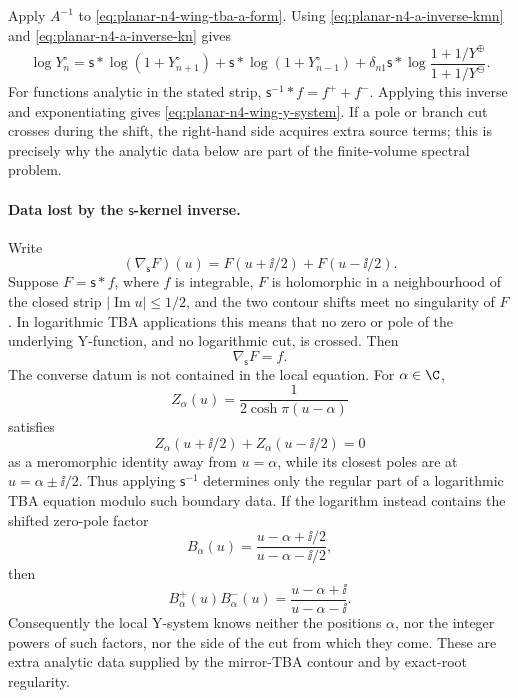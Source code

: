 Apply \(A^{-1}\) to \eqref{eq:planar-n4-wing-tba-a-form}.  Using
\eqref{eq:planar-n4-a-inverse-kmn} and \eqref{eq:planar-n4-a-inverse-kn}
gives
\[
  \log Y_n^\circ
  =
  \mathsf s*\log(1+Y_{n+1}^\circ)
  +
  \mathsf s*\log(1+Y_{n-1}^\circ)
  +
  \delta_{n1}\mathsf s*
  \log\frac{1+1/Y^\oplus}{1+1/Y^\ominus}.
\]
For functions analytic in the stated strip,
\(\mathsf s^{-1}*f=f^+ + f^-\).  Applying this inverse and exponentiating gives
\eqref{eq:planar-n4-wing-y-system}.  If a pole or branch cut crosses during
the shift, the right-hand side acquires extra source terms; this is precisely
why the analytic data below are part of the finite-volume spectral problem.

\paragraph{Data lost by the \(\mathsf s\)-kernel inverse.}
Write
\[
  (\nabla_{\mathsf s}F)(u)=F(u+\ii/2)+F(u-\ii/2).
\]
Suppose \(F=\mathsf s*f\), where \(f\) is integrable, \(F\) is holomorphic in
a neighbourhood of the closed strip \(|\operatorname{Im}u|\leq1/2\), and the
two contour shifts meet no singularity of \(F\).  In logarithmic TBA
applications this means that no zero or pole of the underlying Y-function, and
no logarithmic cut, is crossed.  Then
\begin{equation}
  \nabla_{\mathsf s}F=f .
  \label{eq:planar-n4-s-inverse-regular-domain}
\end{equation}
The converse datum is not contained in the local equation.  For
\(\alpha\in\C\),
\begin{equation}
  Z_\alpha(u)=\frac{1}{2\cosh\pi(u-\alpha)}
  \label{eq:planar-n4-s-inverse-zero-mode}
\end{equation}
satisfies
\[
  Z_\alpha(u+\ii/2)+Z_\alpha(u-\ii/2)=0
\]
as a meromorphic identity away from \(u=\alpha\), while its closest poles are
at \(u=\alpha\pm\ii/2\).  Thus applying \(\mathsf s^{-1}\) determines only the
regular part of a logarithmic TBA equation modulo such boundary data.  If the
logarithm instead contains the shifted zero-pole factor
\[
  B_\alpha(u)=\frac{u-\alpha+\ii/2}{u-\alpha-\ii/2},
\]
then
\begin{equation}
  B_\alpha^+(u)B_\alpha^-(u)
  =
  \frac{u-\alpha+\ii}{u-\alpha-\ii}.
  \label{eq:planar-n4-s-inverse-source-memory}
\end{equation}
Consequently the local Y-system knows neither the positions \(\alpha\), nor
the integer powers of such factors, nor the side of the cut from which they
come.  These are extra analytic data supplied by the mirror-TBA contour and
by exact-root regularity.

